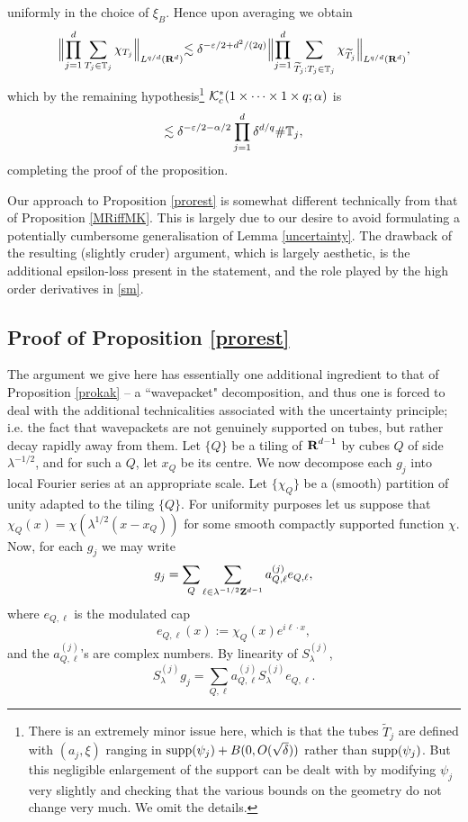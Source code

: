 uniformly in the choice of $\xi_{B}$. Hence upon averaging we
obtain
\begin{eqnarray*}
\begin{aligned}
\Bigl\|\prod_{j=1}^{d}\sum_{T_{j}\in{\mathbb{T}}_{j}}\chi_{T_{j}}\Bigl\|_{L^{q/d}({\bf
R}^d)}\lesssim \delta^{-\varepsilon/2+d^{2}/(2q)}
\Bigl\|\prod_{j=1}^{d}\sum_{\widetilde{T}_{j}:T_{j}\in{\mathbb{T}}_{j}}
\chi_{\widetilde{T}_{j}}\Bigl\|_{L^{q/d}({\bf R}^d)},
\end{aligned}
\end{eqnarray*}
which by the remaining hypothesis\footnote{There is an extremely minor issue here,
which is that the tubes $\tilde T_j$ are defined with $(a_j,\xi)$ ranging in
${\operatorname{supp}}(\psi_{j}) + B(0, O(\sqrt{\delta}))$ rather than ${\operatorname{supp}}(\psi_{j})$.  But this negligible enlargement of the support can be dealt with
by modifying $\psi_j$ very slightly and checking that the various bounds on the geometry do not change very much.  We omit the details.}
 ${\mathcal{K}}^{*}_{c}(1\times\cdots\times
1\times q;\alpha)$ is
$$
\lesssim\delta^{-\varepsilon/2-\alpha/2}\prod_{j=1}^{d}\delta^{d/q}\mbox{\#}{\mathbb{T}}_{j},
$$
completing the proof of the proposition.

\begin{remark}
Our approach to Proposition \ref{prorest} is somewhat different
technically from that of Proposition \ref{MRiffMK}. This is
largely due to our desire to avoid formulating a potentially
cumbersome generalisation of Lemma \ref{uncertainty}. The drawback
of the resulting (slightly cruder) argument, which is largely
aesthetic, is the additional epsilon-loss present in the
statement, and the role played by the high order derivatives in
\eqref{sm}.
\end{remark}

\subsection*{Proof of Proposition \ref{prorest}} The argument we give
here has essentially one additional ingredient to that of
Proposition \ref{prokak} -- a ``wavepacket" decomposition, and
thus one is forced to deal with the additional technicalities
associated with the uncertainty principle; i.e. the fact that
wavepackets are not genuinely supported on tubes, but rather decay
rapidly away from them. Let $\{Q\}$ be a tiling of ${\hbox{\bf R}}^{d-1}$ by
cubes $Q$ of side $\lambda^{-1/2}$, and for such a $Q$, let $x_{Q}$ be
its centre. We now decompose each $g_{j}$
into local Fourier series at an appropriate scale. Let
$\{\chi_{Q}\}$ be a (smooth) partition of unity adapted to the
tiling $\{Q\}$. For uniformity purposes let us suppose that
$\chi_{Q}(x)=\chi(\lambda^{1/2}(x-x_Q))$ for some smooth compactly
supported function $\chi$. Now, for each $g_{j}$ we may write
$$
g_{j}=\sum_{Q} \sum_{\ell\in\lambda^{-1/2}{\bf
Z}^{d-1}}a_{Q,\ell}^{(j)}e_{Q,\ell},
$$
where $e_{Q,\ell}$ is the modulated cap
$$e_{Q,\ell}(x):=\chi_{Q}(x)e^{i\ell\cdot x},
$$
and the $a_{Q,\ell}^{(j)}$'s are complex numbers. By linearity of
$S_{\lambda}^{(j)}$,
$$
S_{\lambda}^{(j)}g_{j}=\sum_{Q,\ell}a_{Q,\ell}^{(j)}S_{\lambda}^{(j)}e_{Q,\ell}.
$$

